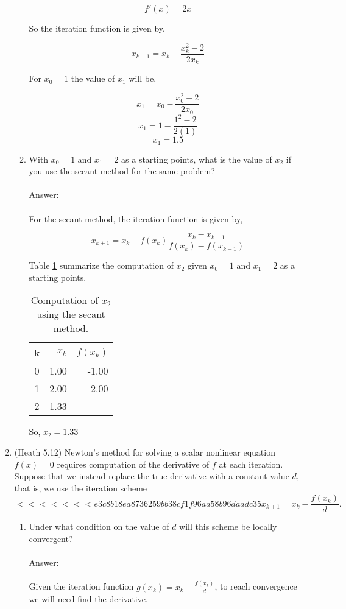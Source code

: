 \documentclass{article}
\begin{document}
\begin{enumerate}
\begin{enumerate}
$$f'(x)=2x$$

So the iteration function is given by,

$$x_{k+1}=x_k-\frac{x_k^2-2}{2x_k}$$

For $x_0=1$ the value of $x_1$ will be,

$$x_{1}=x_0-\frac{x_0^2-2}{2x_0}$$
$$x_{1}=1-\frac{1^2-2}{2(1)}$$
$$x_{1}=1.5$$
\item With $x_0 = 1$ and $x_1 = 2$ as a starting points, what is the value of $x_2$ if you use the secant method for the same problem?
\\
\\
Answer:\\
\\
For the secant method, the iteration function is given by,

$$x_{k+1}=x_k-f(x_k)\frac{x_k-x_{k-1}}{f(x_k)-f(x_{k-1})}$$

Table \ref{tab:q7a} summarize the computation of $x_2$ given $x_0 = 1$ and $x_1 = 2$ as a starting points.

\begin{table}[h]
 \centering
 \begin{center}
\begin{tabular}{crr}
\toprule
k & $x_k$ & $f(x_k)$\\
\midrule
0 & 1.00 & -1.00\\
1 & 2.00 &  2.00\\
2 & 1.33 & \\
\bottomrule
 \end{tabular}
 \end{center}
 \caption{Computation of $x_2$ using the secant method.}
 \label{tab:q7a}
\end{table}

So, $x_2=1.33$
 
\end{enumerate}

\item (Heath 5.12) Newton's method for solving a scalar nonlinear equation $f(x) = 0$ requires computation of the derivative of $f$ at each iteration.  Suppose that we instead replace
  the true derivative with a constant value $d$, that is, we use the iteration scheme
$$
<<<<<<< e3c8b18ea8736259bb38cf1f96aa58b96daadc35
x_{k+1} = x_k - \frac{f(x_k)}{d}.
$$
\begin{enumerate}
\item Under what condition on the value of $d$ will this scheme be locally convergent?
\\
\\
Answer:\\
\\
Given the iteration function $g(x_k)=x_k-\frac{f(x_k)}{d}$, to reach convergence we will need find the derivative,


\end{enumerate}
\end{enumerate}
\end{document}
